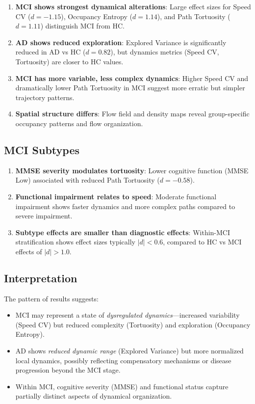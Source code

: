 \documentclass[5p,twocolumn,authoryear]{elsarticle}
\begin{document}
\begin{enumerate}
    \item \textbf{MCI shows strongest dynamical alterations}: Large effect sizes for Speed CV ($d = -1.15$), Occupancy Entropy ($d = 1.14$), and Path Tortuosity ($d = 1.11$) distinguish MCI from HC.

    \item \textbf{AD shows reduced exploration}: Explored Variance is significantly reduced in AD vs HC ($d = 0.82$), but dynamics metrics (Speed CV, Tortuosity) are closer to HC values.

    \item \textbf{MCI has more variable, less complex dynamics}: Higher Speed CV and dramatically lower Path Tortuosity in MCI suggest more erratic but simpler trajectory patterns.

    \item \textbf{Spatial structure differs}: Flow field and density maps reveal group-specific occupancy patterns and flow organization.
\end{enumerate}

\subsection{MCI Subtypes}

\begin{enumerate}
    \item \textbf{MMSE severity modulates tortuosity}: Lower cognitive function (MMSE Low) associated with reduced Path Tortuosity ($d = -0.58$).

    \item \textbf{Functional impairment relates to speed}: Moderate functional impairment shows faster dynamics and more complex paths compared to severe impairment.

    \item \textbf{Subtype effects are smaller than diagnostic effects}: Within-MCI stratification shows effect sizes typically $|d| < 0.6$, compared to HC vs MCI effects of $|d| > 1.0$.
\end{enumerate}

\subsection{Interpretation}

The pattern of results suggests:
\begin{itemize}
    \item MCI may represent a state of \emph{dysregulated dynamics}---increased variability (Speed CV) but reduced complexity (Tortuosity) and exploration (Occupancy Entropy).

    \item AD shows \emph{reduced dynamic range} (Explored Variance) but more normalized local dynamics, possibly reflecting compensatory mechanisms or disease progression beyond the MCI stage.

    \item Within MCI, cognitive severity (MMSE) and functional status capture partially distinct aspects of dynamical organization.
\end{itemize}
\end{document}

